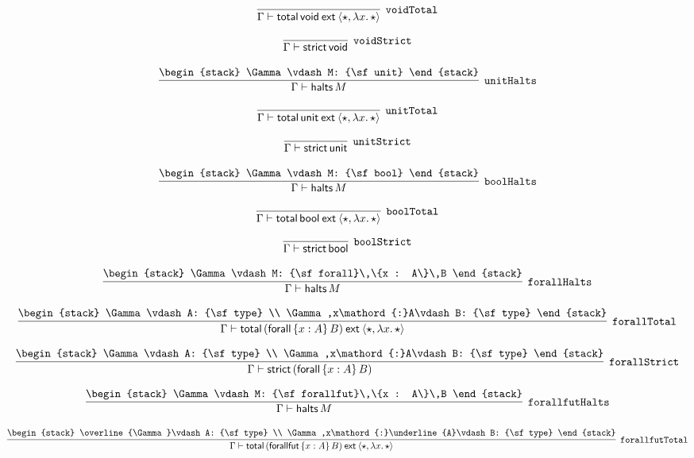 \[
\infer[{\tt voidTotal}]{\Gamma \vdash {\sf total}\,{\sf void}\:{\sf ext}\:\langle \star ,\lambda x.\,\star \rangle }{}
\]

\[
\infer[{\tt voidStrict}]{\Gamma \vdash {\sf strict}\,{\sf void}}{}
\]

\[
\infer[{\tt unitHalts}]{\Gamma \vdash {\sf halts}\,M}{
\begin{stack}
\Gamma \vdash M: {\sf unit}
\end{stack}}
\]

\[
\infer[{\tt unitTotal}]{\Gamma \vdash {\sf total}\,{\sf unit}\:{\sf ext}\:\langle \star ,\lambda x.\,\star \rangle }{}
\]

\[
\infer[{\tt unitStrict}]{\Gamma \vdash {\sf strict}\,{\sf unit}}{}
\]

\[
\infer[{\tt boolHalts}]{\Gamma \vdash {\sf halts}\,M}{
\begin{stack}
\Gamma \vdash M: {\sf bool}
\end{stack}}
\]

\[
\infer[{\tt boolTotal}]{\Gamma \vdash {\sf total}\,{\sf bool}\:{\sf ext}\:\langle \star ,\lambda x.\,\star \rangle }{}
\]

\[
\infer[{\tt boolStrict}]{\Gamma \vdash {\sf strict}\,{\sf bool}}{}
\]

\[
\infer[{\tt forallHalts}]{\Gamma \vdash {\sf halts}\,M}{
\begin{stack}
\Gamma \vdash M: {\sf forall}\,\{x : A\}\,B
\end{stack}}
\]

\[
\infer[{\tt forallTotal}]{\Gamma \vdash {\sf total}\,({\sf forall}\,\{x : A\}\,B)\:{\sf ext}\:\langle \star ,\lambda x.\,\star \rangle }{
\begin{stack}
\Gamma \vdash A: {\sf type}
\\
\Gamma ,x\mathord{:}A\vdash B: {\sf type}
\end{stack}}
\]

\[
\infer[{\tt forallStrict}]{\Gamma \vdash {\sf strict}\,({\sf forall}\,\{x : A\}\,B)}{
\begin{stack}
\Gamma \vdash A: {\sf type}
\\
\Gamma ,x\mathord{:}A\vdash B: {\sf type}
\end{stack}}
\]

\[
\infer[{\tt forallfutHalts}]{\Gamma \vdash {\sf halts}\,M}{
\begin{stack}
\Gamma \vdash M: {\sf forallfut}\,\{x : A\}\,B
\end{stack}}
\]

\[
\infer[{\tt forallfutTotal}]{\Gamma \vdash {\sf total}\,({\sf forallfut}\,\{x : A\}\,B)\:{\sf ext}\:\langle \star ,\lambda x.\,\star \rangle }{
\begin{stack}
\overline{\Gamma}\vdash A: {\sf type}
\\
\Gamma ,x\mathord{:}\underline{A}\vdash B: {\sf type}
\end{stack}}
\]

